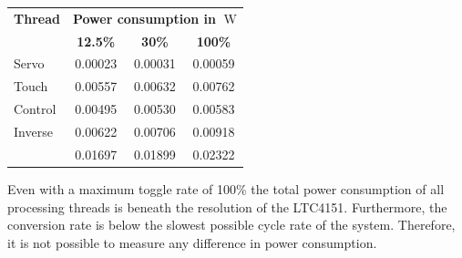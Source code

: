 \begin{table}
	\scriptsize
	\centering
	\label{tab:xpower}
	\begin{tabular}{lccc}
	\hline
	\textbf{Thread} & \multicolumn{3}{c}{\textbf{Power consumption in $\SI{}{\watt}$}}\\
	& \textbf{12.5\%} & \textbf{30\%} & \textbf{100\%}\\
	\hline
	Servo & 0.00023 & 0.00031 & 0.00059\\
	Touch & 0.00557 & 0.00632 & 0.00762\\
	Control & 0.00495 & 0.00530 & 0.00583\\
	Inverse & 0.00622 & 0.00706 & 0.00918\\
	\hline
	& 0.01697 & 0.01899 & 0.02322\\
	\hline
	\end{tabular}
\end{table}
Even with a maximum toggle rate of 100\% the total power consumption of all
processing threads is beneath the resolution of the LTC4151. Furthermore, the
conversion rate is below the slowest possible cycle rate of the system.
Therefore, it is not possible to measure any difference in power consumption.